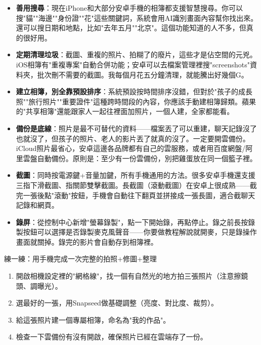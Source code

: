 \begin{itemize}
  \item \textbf{善用搜尋}：現在iPhone和大部分安卓手機的相簿都支援智慧搜尋。你可以搜"貓""海邊""身份證""花"這些關鍵詞，系統會用AI識別畫面內容幫你找出來。還可以搜日期和地點，比如"去年五月""北京"。這個功能知道的人不多，但真的很好用。
  \item \textbf{定期清理垃圾}：截圖、重複的照片、拍糊了的廢片，這些才是佔空間的元兇。iOS相簿有"重複專案"自動合併功能；安卓可以去檔案管理裡搜"screenshots"資料夾，批次刪不需要的截圖。我每個月花五分鐘清理，就能騰出好幾個G。
  \item \textbf{建立相簿，別全靠預設排序}：系統預設按時間排序沒錯，但對於"孩子的成長照""旅行照片""重要證件"這種跨時間段的內容，你應該手動建相簿歸類。蘋果的"共享相簿"還能跟家人一起往裡面加照片，一個人建，全家都能看。
  \item \textbf{備份是底線}：照片是最不可替代的資料——檔案丟了可以重建，聊天記錄沒了也就沒了，但孩子的照片、老人的影片丟了就真的沒了。一定要開雲備份。iCloud照片最省心，安卓這邊各品牌都有自己的雲服務，或者用百度網盤/阿里雲盤自動備份。原則是：至少有一份雲備份，別把雞蛋放在同一個籃子裡。
\end{itemize}


\begin{itemize}
  \item \textbf{截圖}：同時按電源鍵+音量加鍵，所有手機通用的方法。很多安卓手機還支援三指下滑截圖、指關節雙擊截圖。長截圖（滾動截圖）在安卓上很成熟——截完一張後點"滾動"按鈕，手機會自動往下翻頁並拼接成一張長圖，適合截聊天記錄和網頁。
  \item \textbf{錄屏}：從控制中心新增"螢幕錄製"，點一下開始錄，再點停止。錄之前長按錄製按鈕可以選擇是否錄製麥克風聲音——你要做教程解說就開麥，只是錄操作畫面就關掉。錄完的影片會自動存到相簿裡。
\end{itemize}

\begin{tcbpractice}{練一練：用手機完成一次完整的拍照+修圖+整理}
\begin{enumerate}
  \item 開啟相機設定裡的"網格線"，找一個有自然光的地方拍三張照片（注意擦鏡頭、調曝光）。
  \item 選最好的一張，用Snapseed做基礎調整（亮度、對比度、裁剪）。
  \item 給這張照片建一個專屬相簿，命名為"我的作品"。
  \item 檢查一下雲備份有沒有開啟，確保照片已經在雲端存了一份。
\end{enumerate}

\end{tcbpractice}
